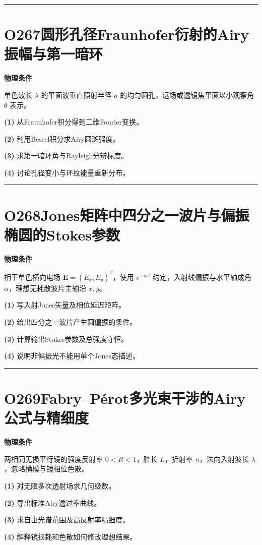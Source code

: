 \documentclass[UTF8,a4paper,11pt,oneside,openany]{ctexbook}
\begin{document}
\par\bigskip\hrule\bigskip
\section*{O267\quad 圆形孔径Fraunhofer衍射的Airy振幅与第一暗环}
\textbf{物理条件}\par 单色波长 \(\lambda\) 的平面波垂直照射半径 \(a\) 的均匀圆孔，远场或透镜焦平面以小观察角 \(\theta\) 表示。
\par\noindent\textbf{(1)} 从Fraunhofer积分得到二维Fourier变换。
\par\noindent\textbf{(2)} 利用Bessel积分求Airy圆斑强度。
\par\noindent\textbf{(3)} 求第一暗环角与Rayleigh分辨标度。
\par\noindent\textbf{(4)} 讨论孔径变小与环纹能量重新分布。

\par\bigskip\hrule\bigskip
\section*{O268\quad Jones矩阵中四分之一波片与偏振椭圆的Stokes参数}
\textbf{物理条件}\par 相干单色横向电场 \(\boldsymbol E=(E_x,E_y)^T\)，使用 \(e^{-i\omega t}\) 约定，入射线偏振与水平轴成角 \(\alpha\)，理想无耗散波片主轴沿 \(x,y\)。
\par\noindent\textbf{(1)} 写入射Jones矢量及相位延迟矩阵。
\par\noindent\textbf{(2)} 给出四分之一波片产生圆偏振的条件。
\par\noindent\textbf{(3)} 计算输出Stokes参数及总强度守恒。
\par\noindent\textbf{(4)} 说明非偏振光不能用单个Jones态描述。

\par\bigskip\hrule\bigskip
\section*{O269\quad Fabry–Pérot多光束干涉的Airy公式与精细度}
\textbf{物理条件}\par 两相同无损平行镜的强度反射率 \(0<R<1\)，腔长 \(L\)，折射率 \(n\)，法向入射波长 \(\lambda\)，忽略横模与镜相位色散。
\par\noindent\textbf{(1)} 对无限多次透射场求几何级数。
\par\noindent\textbf{(2)} 导出标准Airy透过率曲线。
\par\noindent\textbf{(3)} 求自由光谱范围及高反射率精细度。
\par\noindent\textbf{(4)} 解释镜损耗和色散如何修改理想结果。
\end{document}
